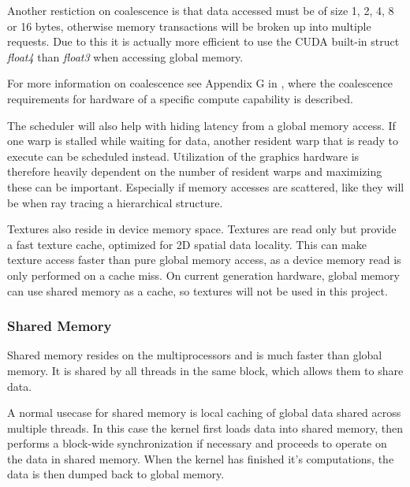 
Another restiction on coalescence is that data accessed must be
of
size 1, 2, 4, 8 or 16 bytes, otherwise memory transactions will be broken up
into multiple requests. Due to this it is actually more efficient to
use the CUDA built-in struct \textit{float4} than \textit{float3} when
accessing global memory.

For more information on coalescence see Appendix G in
, where the coalescence requirements for hardware of
a specific compute capability is described.


The scheduler will also help with hiding latency from a global memory
access. If one warp is stalled while waiting for data, another
resident warp that is ready to execute can be scheduled
instead. Utilization of the graphics hardware is therefore heavily
dependent on the number of resident warps and maximizing these can be
important. Especially if memory accesses are scattered, like they will
be when ray tracing a hierarchical structure.


Textures also reside in device memory space. Textures are read only
but provide a fast texture cache, optimized for 2D spatial data
locality. This can make texture access faster than pure global memory
access, as a device memory read is only performed on a cache miss. On
current generation hardware, global memory can use shared memory as a
cache, so textures will not be used in this project.

\subsubsection{Shared Memory}


Shared memory resides on the multiprocessors and is much faster than
global memory. It is shared by all threads in the same block, which
allows them to share data.


A normal usecase for shared memory is local caching of global data
shared across multiple threads. In this case the kernel first loads
data into shared memory, then performs a block-wide synchronization if
necessary and proceeds to operate on the data in shared memory. When
the kernel has finished it's computations, the data is then dumped
back to global memory.

